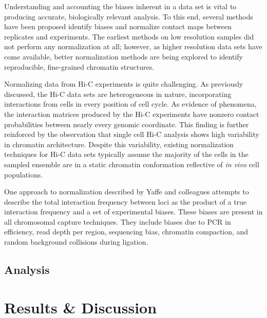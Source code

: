 \documentclass[phd,tocprelim]{cornell}
\begin{document}
Understanding and accounting the biases inherent in a data set is vital to
producing accurate, biologically relevant analysis.  To this end, several methods
have been proposed identify biases and normalize contact maps between replicates
and experiments\cite{yaffe2011}\cite{hu2012}\cite{yang2014}.  The earliest methods on low
resolution samples did not perform any normalization at all\cite{aiden2009};
however, as higher resolution data sets have come available, better
normalization methods are being explored to identify reproducible,
fine-grained chromatin structures.

Normalizing data from Hi-C experiments is quite challenging.  As previously
discussed, the Hi-C data sets are heterogeneous in nature, incorporating
interactions from cells in every position of cell cycle.  As evidence of phenomena,
the interaction matrices produced by the Hi-C experiments have nonzero contact
probabilities between nearly every genomic coordinate\cite{dekker2013}.  This
finding is further reinforced by the observation that single cell Hi-C analysis
shows high variability in chromatin architecture\cite{nagano2013}.  Despite this
variability, existing normalization techniques for Hi-C data sets typically
assume the majority of the cells in the sampled ensemble are in a static
chromatin conformation reflective of \textit{in vivo} cell populations.

One approach to normalization described by Yaffe and colleagues\cite{yaffe2011}
attempts to describe the total interaction frequency between loci as the product
of a true interaction frequency and a set of experimental biases.  These biases
are present in all chromosomal capture techniques.  They include biases due to
PCR in efficiency, read depth per region, sequencing bias, chromatin compaction,
and random background collisions during ligation\cite{benner2014}\cite{dekker2006}.




\section{Analysis}



\chapter{Results \& Discussion}
\end{document}
